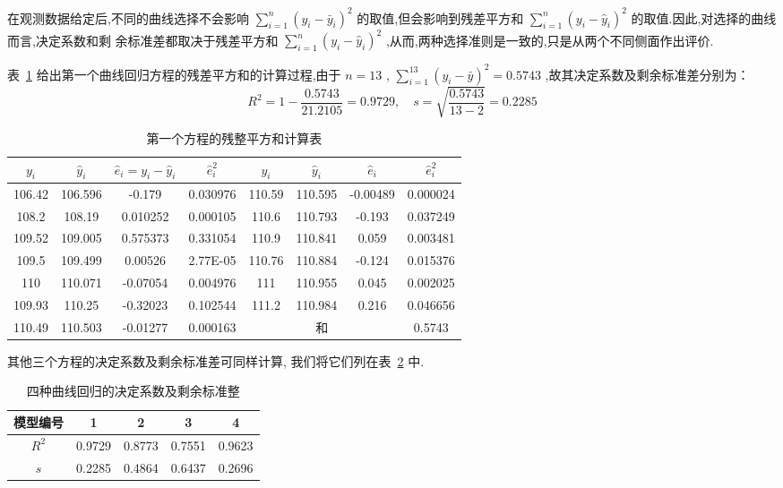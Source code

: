 在观测数据给定后,不同的曲线选择不会影响 $\sum_{i=1}^{n} (y_i-\bar{y}_i)^2$ 的取值,但会影响到残差平方和 $\sum_{i=1}^{n} (y_i-\hat{y}_i)^2$ 的取值.因此,对选择的曲线而言,决定系数和剩
余标准差都取决于残差平方和 $\sum_{i=1}^{n} (y_i-\hat{y}_i)^2$ ,从而,两种选择准则是一致的,只是从两个不同侧面作出评价.

表~\ref{tab:8.5.4} 给出第一个曲线回归方程的残差平方和的计算过程,由于 $n=13$ , $\sum\limits_{i=1}^{13}(y_i-\bar{y})^2=0.5743$ ,故其决定系数及剩余标准差分别为：
\begin{equation*}
R^{2}=1-\frac{0.5743}{21.2105}=0.9729, \quad s=\sqrt{\frac{0.5743}{13-2}}=0.2285
\end{equation*}
\begin{table}[htbp]
  \renewcommand*{\arraystretch}{1.5}
    \centering
    \caption{第一个方程的残整平方和计算表}
    \begin{tabular}{cccc|cccc}
        \toprule
     $y_i$   &  $\hat{y}_i$  &  $\hat{e}_i=y_{i} - \hat{y}_i$  &  $\hat{e}_i^2$  &  $y_i$   &  $\hat{y}_i$  &  $\hat{e}_i$  &  $\hat{e}_i^2$  \\\midrule
        106.42 & 106.596 & -0.179 & 0.030976 & 110.59 & 110.595 & -0.00489 & 0.000024 \\
        108.2 & 108.19 & 0.010252 & 0.000105 & 110.6 & 110.793 & -0.193 & 0.037249 \\
        109.52 & 109.005 & 0.575373 & 0.331054 & 110.9 & 110.841 & 0.059 & 0.003481 \\
        109.5 & 109.499 & 0.00526 & 2.77E-05 & 110.76 & 110.884 & -0.124 & 0.015376 \\
        110   & 110.071 & -0.07054 & 0.004976 & 111   & 110.955 & 0.045 & 0.002025 \\
        109.93 & 110.25 & -0.32023 & 0.102544 & 111.2 & 110.984 & 0.216 & 0.046656 \\
        110.49 & 110.503 & -0.01277 & 0.000163 & \multicolumn{3}{c}{和} & 0.5743 \\\bottomrule
    \end{tabular}%
    \label{tab:8.5.4}%
\end{table}%
其他三个方程的决定系数及剩余标准差可同样计算, 我们将它们列在表~\ref{tab:8.5.5} 中.
\begin{table}[!htb]
    \centering
    \caption{四种曲线回归的决定系数及剩余标准整}
    \begin{tabular}{ccccc}
    \toprule
    模型编号  & 1      & 2      & 3      & 4      \\
    \midrule
    $R^2$    & 0.9729 & 0.8773 & 0.7551 & 0.9623 \\
    $s$      & 0.2285 & 0.4864 & 0.6437 & 0.2696 \\
    \bottomrule
    \end{tabular}%
    \label{tab:8.5.5}%
\end{table}%

